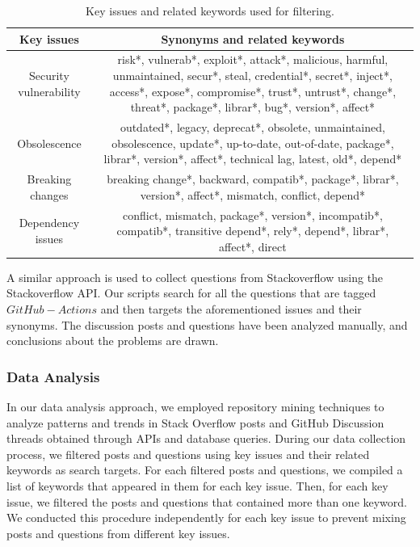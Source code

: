 \documentclass[conference]{IEEEtran}
\begin{document}
    \begin{table}[H]
            \centering
            \caption{Key issues and related keywords used for filtering.}
            \label{tab:related_keywords}
	        \hspace{5cm}
            \begin{tabular}{|c|c|}
              \hline
              \textbf{Key issues} & \textbf{Synonyms and related keywords} \\
              \hline
              Security vulnerability & \parbox[t]{5.5cm}{risk*, vulnerab*, exploit*, attack*, malicious, harmful, unmaintained, secur*, steal, credential*, secret*, inject*, access*, expose*, compromise*, trust*, untrust*, change*, threat*, package*, librar*, bug*,  version*, affect*\\}  \\
             \hline
             Obsolescence & \parbox[t]{5.5cm}{outdated*, legacy, deprecat*, obsolete, unmaintained, obsolescence, update*, up-to-date, out-of-date, package*, librar*, version*, affect*, technical lag, latest, old*, depend*\\}  \\
              \hline
              Breaking changes & \parbox[t]{5.5cm}{breaking change*,  backward, compatib*, package*, librar*, version*, affect*, mismatch, conflict, depend*\\} \\
              \hline
              Dependency issues &  \parbox[t]{5.5cm}{conflict, mismatch, package*, version*, incompatib*, compatib*, transitive depend*, rely*, depend*, librar*, affect*, direct\\}  \\
              \hline
          \end{tabular}

    \end{table}
                A similar approach is used to collect questions from Stackoverflow using the Stackoverflow API. Our scripts search for all the questions that are tagged $GitHub-Actions$ and then targets the aforementioned issues and their synonyms. The discussion posts and questions have been analyzed manually, and conclusions about the problems are drawn.\\


            \subsubsection{\textbf{Data Analysis}}
                In our data analysis approach, we employed repository mining techniques to analyze patterns and trends in Stack Overflow posts and GitHub Discussion threads obtained through APIs and database queries. During our data collection process, we filtered posts and questions using key issues and their related keywords as search targets. For each filtered posts and questions, we compiled a list of keywords that appeared in them for each key issue. Then, for each key issue, we filtered the posts and questions that contained more than one keyword. We conducted this procedure independently for each key issue to prevent mixing posts and questions from different key issues.
\end{document}
